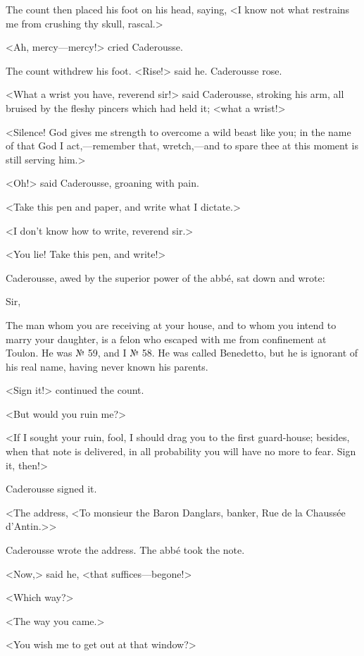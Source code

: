  The count then placed his foot on his head, saying, <I know not what restrains me from crushing thy skull, rascal.> 

 <Ah, mercy—mercy!> cried Caderousse. 

 The count withdrew his foot.  <Rise!> said he. Caderousse rose. 

 <What a wrist you have, reverend sir!> said Caderousse, stroking his arm, all bruised by the fleshy pincers which had held it; <what a wrist!> 

 <Silence! God gives me strength to overcome a wild beast like you; in the name of that God I act,—remember that, wretch,—and to spare thee at this moment is still serving him.> 

 <Oh!> said Caderousse, groaning with pain. 

 <Take this pen and paper, and write what I dictate.> 

 <I don't know how to write, reverend sir.> 

 <You lie! Take this pen, and write!> 

 Caderousse, awed by the superior power of the abbé, sat down and wrote:  
 
 \begin{mail}{}{Sir,}
 
 The man whom you are receiving at your house, and to whom you intend to marry your daughter, is a felon who escaped with me from confinement at Toulon. He was № 59, and I № 58. He was called Benedetto, but he is ignorant of his real name, having never known his parents.
 \end{mail}

 <Sign it!> continued the count. 

 <But would you ruin me?> 

 <If I sought your ruin, fool, I should drag you to the first guard-house; besides, when that note is delivered, in all probability you will have no more to fear. Sign it, then!> 

 Caderousse signed it. 

 <The address, <To monsieur the Baron Danglars, banker, Rue de la Chaussée d'Antin.>> 

 Caderousse wrote the address. The abbé took the note. 

 <Now,> said he, <that suffices—begone!> 

 <Which way?> 

 <The way you came.> 

 <You wish me to get out at that window?> 

